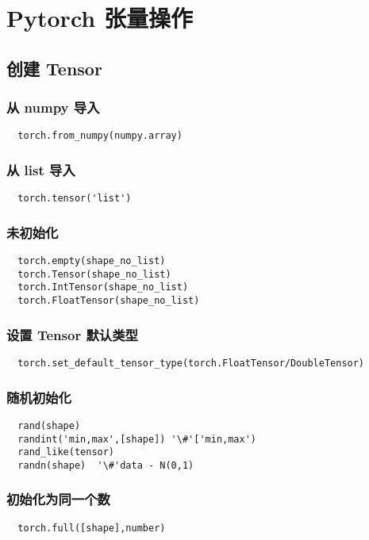 \section{Pytorch 张量操作}
\subsection{创建 Tensor}
\subsubsection{从 numpy 导入}
\begin{lstlisting}
  torch.from_numpy(numpy.array)
\end{lstlisting}

\subsubsection{从 list 导入}
\begin{lstlisting}
  torch.tensor('list')
\end{lstlisting}

\subsubsection{未初始化}
\begin{lstlisting}
  torch.empty(shape_no_list)
  torch.Tensor(shape_no_list)
  torch.IntTensor(shape_no_list)
  torch.FloatTensor(shape_no_list)
\end{lstlisting}

\subsubsection{设置 Tensor 默认类型}
\begin{lstlisting}
  torch.set_default_tensor_type(torch.FloatTensor/DoubleTensor)
\end{lstlisting}

\subsubsection{随机初始化}
\begin{lstlisting}
  rand(shape)
  randint('min,max',[shape]) '\#'['min,max')
  rand_like(tensor)
  randn(shape)  '\#'data - N(0,1)
\end{lstlisting}

\subsubsection{初始化为同一个数}
\begin{lstlisting}
  torch.full([shape],number)
\end{lstlisting}

